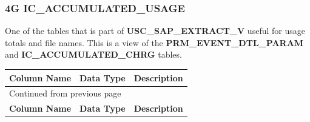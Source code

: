 \documentclass[12pt,twoside]{article}
\begin{document}
\subsubsection{4G IC\_ACCUMULATED\_USAGE}
\label{sec:orgheadline139}
One of the tables that is part of \textbf{USC\_SAP\_EXTRACT\_V} useful for usage totals and file names. This is a view of the \textbf{PRM\_EVENT\_DTL\_PARAM} and \textbf{IC\_ACCUMULATED\_CHRG} tables.
\footnotesize

\begin{longtable}{l|l|l}
\hline
\textbf{Column Name} & \textbf{Data Type} & \textbf{Description}\\
\hline
\endfirsthead
\multicolumn{3}{l}{Continued from previous page} \\
\hline

\textbf{Column Name} & \textbf{Data Type} & \textbf{Description} \\


\end{longtable}
\end{document}
